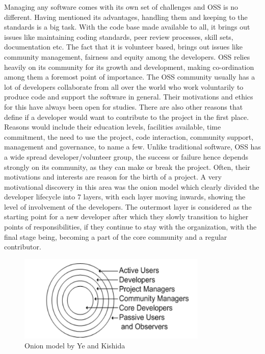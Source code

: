 \documentclass[seploa]{beavtex}
\begin{document}
Managing any software comes with its own set of challenges and OSS is no different. Having mentioned its advantages, handling them and keeping to the standards is a big task. With the code base made available to all, it brings out issues like maintaining coding standards, peer review processes, skill sets, documentation etc\cite{tum2005}. The fact that it is volunteer based, brings out issues like community management, fairness and equity among the developers. OSS relies heavily on its community for its growth and development\cite{seth2010}, making co-ordination among them a foremost point of importance. The OSS community usually has a lot of developers collaborate from all over the world who work voluntarily to produce code and support the software in general. Their motivations and ethics for this have always been open for studies\cite{greg2002}. There are also other reasons that define if a developer would want to contribute to the project in the first place. Reasons would include their education levels, facilities available, time commitment, the need to use the project, code interaction, community support, management and governance, to name a few\cite{chawn2012}. Unlike traditional software, OSS has a wide spread developer/volunteer group, the success or failure hence depends strongly on its community, as they can make or break the project. Often, their motivations and interests are reason for the birth of a project. A very motivational discovery in this area was the onion model which clearly divided the developer lifecycle into 7 layers, with each layer moving inwards, showing the level of involvement of the developers. The outermost layer is considered as the starting point for a new developer after which they slowly transition to higher points of responsibilities, if they continue to stay with the organization, with the final stage being, becoming a part of the core community and a regular contributor\cite{kishida2003}.

\begin{figure}[H]
\centering
\includegraphics[width=90mm]{onion.png}
\caption{Onion model by Ye and Kishida}
\end{figure}
\end{document}
